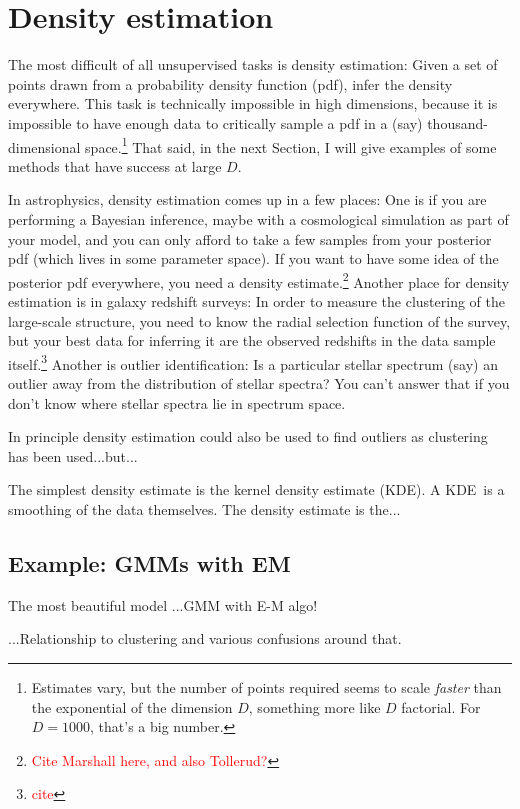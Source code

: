 \documentclass[12pt, twoside, letterpaper]{article}
\newcommand{\sectionname}{Section}
\newcommand{\acronym}[1]{{\small{#1}}}
\newcommand{\KDE}{\acronym{KDE}}
\newcommand{\todo}[1]{\textcolor{red}{#1}}  %
\begin{document}
\section{Density estimation}

The most difficult of all unsupervised tasks is density estimation:
Given a set of points drawn from a probability density function (pdf),
infer the density everywhere.
This task is technically impossible in high dimensions, because it is
impossible to have enough data to critically sample a pdf in a (say)
thousand-dimensional space.\footnote{Estimates vary, but the number of points
  required seems to scale \emph{faster} than the exponential of the dimension $D$,
  something more like $D$ factorial. For $D=1000$, that's a big number.}
That said, in the next \sectionname, I will give examples of some methods
that have success at large $D$.

In astrophysics, density estimation comes up in a few places:
One is if you are performing a Bayesian inference, maybe with a cosmological simulation
as part of your model, and you can only afford to take a few samples from your posterior
pdf (which lives in some parameter space).
If you want to have some idea of the posterior pdf everywhere, you
need a density estimate.\footnote{\todo{Cite Marshall here, and also
    Tollerud?}}
Another place for density estimation is in galaxy redshift surveys:
In order to measure the clustering of the large-scale structure, you need to
know the radial selection function of the survey, but your best data for inferring
it are the observed redshifts in the data sample itself.\footnote{\todo{cite}}
Another is outlier identification: Is a particular stellar spectrum (say) an
outlier away from the distribution of stellar spectra?
You can't answer that if you don't know where stellar spectra lie in spectrum space.

In principle density estimation could also be used to find outliers as clustering
has been used...but...

The simplest density estimate is the kernel density estimate (\KDE).
A \KDE\ is a smoothing of the data themselves.
The density estimate is the...

\subsection{Example: GMMs with EM}

The most beautiful model 
...GMM with E-M algo!

...Relationship to clustering and various confusions around that.
\end{document}
